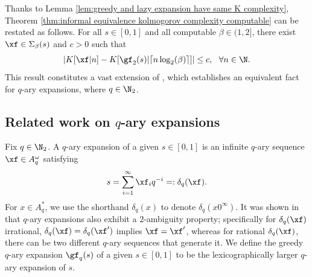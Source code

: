 Thanks to Lemma \ref{lem:greedy and lazy expansion have same K complexity}, Theorem \ref{thm:informal equivalence kolmogorov complexity computable} can be restated as follows. For all $s \in [0,1]$ and all computable $\beta \in (1,2]$, there exist $\xf \in \Sigma_\beta(s)$ and $c > 0$ such that
\begin{equation}\label{eq:equivalence algorithmic complexity beta expansion binary expansion}
	\left|K[\xf|n] - K[\gf_2(s)|\lceil n \log_2(\beta)\rceil] \right| \leq c, \ \ \forall n \in \N.
\end{equation}
This result constitutes a vast extension of \cite[Theorem 3]{staiger2002kolmogorov}, which establishes an equivalent fact for $q$-ary expansions, where $q \in \N_2$.

\subsection{\texorpdfstring{Related work on $q$-ary expansions}{}}

Fix $q \in \N_2$. A $q$-ary expansion of a given $s \in [0,1]$ is an infinite $q$-ary sequence $\xf \in A_q^\omega$ satisfying
\begin{equation}
	s = \sum_{i=1}^\infty \xf_i q^{-i} =: \delta_q(\xf).
\end{equation}
For $x \in A_q^\ast$, we use the shorthand $\delta_q(x)$ to denote $\delta_q(x0^\infty)$. It was shown in \cite[Section 7.2]{calude2002information} that $q$-ary expansions also exhibit a $2$-ambiguity property; specifically for $\delta_q(\xf)$ irrational, $\delta_q(\xf) = \delta_q(\xf')$ implies $\xf = \xf'$, whereas for rational $\delta_q(\xf)$, there can be two different $q$-ary sequences that generate it. We define the greedy $q$-ary expansion $\gf_q(s)$ of a given $s \in [0,1]$ to be the lexicographically larger $q$-ary expansion of $s$. 

